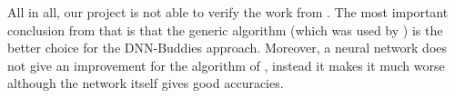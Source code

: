 \documentclass[11pt]{report}
\begin{document}
All in all, our project is not able to verify the work from \cite{sholomon2016dnn}. The most important conclusion from that is that the generic algorithm (which was used by \cite{sholomon2016dnn}) is the better choice for the DNN-Buddies approach. Moreover, a neural network does not give an improvement for the algorithm of \cite{Paikin2015}, instead it makes it much worse although the network itself gives good accuracies.


\end{document}

